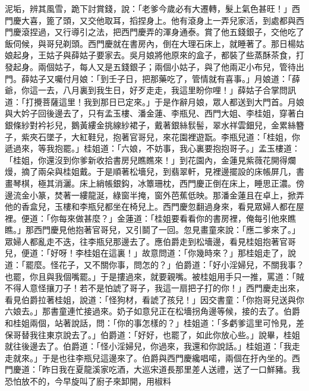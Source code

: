 泥垢，辨其風雪，跪下討賞錢，說：「老爹今歲必有大遷轉，髮上氣色甚旺！」西門慶大喜，篦了頭，又交他取耳，搯捏身上。他有滾身上一弄兒家活，到處都與西門慶滾捏過，又行導引之法，把西門慶弄的渾身通泰。賞了他五錢銀子，交他吃了飯伺候，與哥兒剃頭。西門慶就在書房內，倒在大理石床上，就睡著了。那日楊姑娘起身，王姑子與薛姑子要家去。吳月娘將他原來的盒子，都裝了些蒸酥茶食，打發起身。兩個姑子，每人又是五錢銀子；兩個小姑子，與了他兩疋小布兒，管待出門。薛姑子又囑付月娘：「到壬子日，把那藥吃了，管情就有喜事。」月娘道：「薛爺，你這一去，八月裏到我生日，好歹走走，我這里盼你哩！」薛姑子合掌問訊道：「打攪菩薩這里！我到那日已定來。」于是作辭月娘，眾人都送到大門首。月娘與大妗子回後邊去了，只有孟玉樓、潘金蓮、李瓶兒、西門大姐、李桂姐，穿著白銀條紗對衿衫兒，鵝黃縷金挑線紗裙子，戴著銀絲䯼髻，翠水祥雲鈿兒，金累絲簪子，紫夾石墜子，大紅鞋兒，抱著官哥兒，來花園裡遊翫。李瓶兒道：「桂姐，你遞過來，等我抱罷。」桂姐道：「六娘，不妨事，我心裏要抱抱哥子。」孟玉樓道：「桂姐，你還沒到你爹新收拾書房兒瞧瞧來！」到花園內，金蓮見紫薇花開得爛熳，摘了兩朵與桂姐戴。于是順著松墻兒，到翡翠軒，見裡邊擺設的床帳屏几，書畫琴棋，極其消灑。床上綃帳銀鈎，冰簟珊枕，西門慶正倒在床上，睡思正濃。傍邊流金小篆，焚著一縷龍涎，綠窗半掩，窗外芭蕉低映。那潘金蓮且在卓上，掀弄他的香盒兒，玉樓和李瓶兒都坐在椅兒上。西門慶忽翻過身來，看見眾婦人都在屋裡。便道：「你每來做甚麼？」金蓮道：「桂姐要看看你的書房裡，俺每引他來瞧瞧。」那西門慶見他抱著官哥兒，又引鬬了一回。忽見畫童來說：「應二爹來了。」眾婦人都亂走不迭，往李瓶兒那邊去了。應伯爵走到松墻邊，看見桂姐抱著官哥兒，便道：「好呀！李桂姐在這裏！」故意問道：「你幾時來？」那桂姐走了，說道：「罷麼。怪花子，又不關你事，問怎的？」伯爵道：「好小淫婦兒，不關我事？也罷，你且與我個嘴罷。」于是摟過來，就要親嘴。被桂姐用手只一推，罵道：「賊不得人意怪攘刀子！若不是怕諕了哥子，我這一扇把子打的你！」西門慶走出來，看見伯爵拉著桂姐，說道：「怪狗材，看諕了孩兒！」因交書童：「你抱哥兒送與你六娘去。」那書童連忙接過來。奶子如意兒正在松墻拐角邊等候，接的去了。伯爵和桂姐兩個，站著說話，問：「你的事怎樣的？」桂姐道：「多虧爹這里可怜見，差保哥替我往東京說去了。」伯爵道：「好好，也罷了，如此你放心些。」說畢，桂姐就往後邊去了。伯爵道：「怪小淫婦兒，你過來，我還和你說話。」桂姐道：「我走走就來。」于是也往李瓶兒這邊來了。伯爵與西門慶纔唱喏，兩個在扜內坐的。西門慶道：「昨日我在夏龍溪家吃酒，大巡宋道長那里差人送禮，送了一口鮮豬。我恐怕放不的，今早旋叫了廚子來卸開，用椒料 